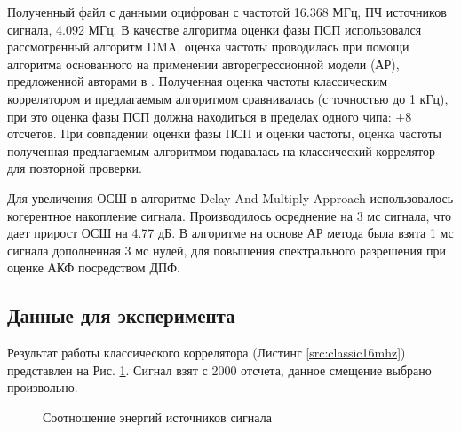 Полученный файл с данными оцифрован с частотой 16.368 МГц, ПЧ источников сигнала, 4.092 МГц. В качестве алгоритма оценки фазы ПСП использовался рассмотренный алгоритм DMA,
оценка частоты проводилась при помощи алгоритма основанного на применении авторегрессионной модели (АР), предложенной авторами в \cite{my_otchet}. Полученная оценка
частоты классическим коррелятором и предлагаемым алгоритмом сравнивалась (с точностью до 1 кГц), при это оценка фазы ПСП должна находиться в пределах одного чипа: ${\pm 8}$
отсчетов. При совпадении оценки фазы ПСП и оценки частоты, оценка частоты полученная предлагаемым алгоритмом подавалась на классический коррелятор для повторной проверки.

Для увеличения ОСШ в алгоритме Delay And Multiply Approach использовалось когерентное накопление сигнала. Производилось осреднение на 3 мс сигнала, что дает прирост ОСШ на 4.77 дБ.
В алгоритме на основе АР метода была взята 1 мс сигнала дополненная 3 мс нулей, для повышения спектрального разрешения при оценке АКФ посредством ДПФ.

\subsection{Данные для эксперимента}

Результат работы классического коррелятора (Листинг \ref{src:classic16mhz}) представлен на Рис. \ref{pic:16mhz_sats_all}.
Сигнал взят с 2000 отсчета, данное смещение выбрано произвольно.
\begin{figure}[h]
\center{}
	\caption{Соотношение энергий источников сигнала}
	\label{pic:16mhz_sats_all}
\end{figure}

